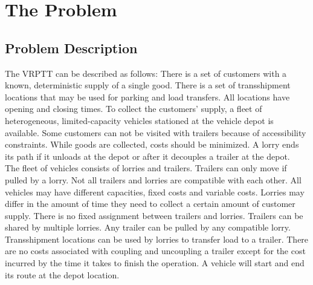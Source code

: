 \section{The Problem}
\label{chap:The Problem}

 \subsection{Problem Description}


The VRPTT can be described as follows:
There is a set of customers with a known, deterministic supply of a single good.
There is a set of transshipment locations that may be used for parking and load transfers.
All locations have opening and closing times.
To collect the customers' supply, a fleet of heterogeneous, limited-capacity vehicles stationed at the vehicle depot is available.
Some customers can not be visited with trailers because of accessibility constraints.
While goods are collected, costs should be minimized.
A lorry ends its path if it unloads at the depot or after it decouples a trailer at the depot. \\

The fleet of vehicles consists of lorries and trailers.
Trailers can only move if pulled by a lorry.
Not all trailers and lorries are compatible with each other.
All vehicles may have different capacities, fixed costs and variable costs.
Lorries may differ in the amount of time they need to collect a certain amount of customer supply.  There is no fixed assignment between trailers and lorries.
Trailers can be shared by multiple lorries.
Any trailer can be pulled by any compatible lorry. \\

Transshipment locations can be used by lorries to transfer load to a trailer.
There are no costs associated with coupling and uncoupling a trailer except for the cost incurred by the time it takes to finish the operation.
A vehicle will start and end its route at the depot location.

